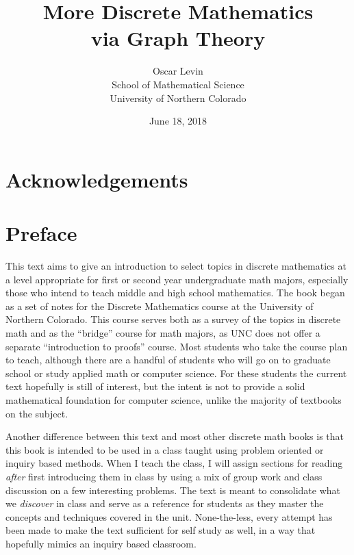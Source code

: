 \documentclass[10pt,]{book}
\title{More Discrete Mathematics\\
{\large via Graph Theory}}
\author{Oscar Levin\\
School of Mathematical Science\\
University of Northern Colorado
}
\date{June 18, 2018}
\theoremstyle{plain}
\theoremstyle{definition}
\theoremstyle{definition}
\theoremstyle{definition}
\theoremstyle{definition}
\numberwithin{equation}{chapter}
\begin{document}
\frontmatter


\chapter*{Acknowledgements}\label{acknowledgement-1}
\chapter*{Preface}\label{preface}
\hypertarget{p-1}{}%
This text aims to give an introduction to select topics in discrete mathematics at a level appropriate for first or second year undergraduate math majors, especially those who intend to teach middle and high school mathematics. The book began as a set of notes for the Discrete Mathematics course at the University of Northern Colorado. This course serves both as a survey of the topics in discrete math and as the ``bridge'' course for math majors, as UNC does not offer a separate ``introduction to proofs'' course. Most students who take the course plan to teach, although there are a handful of students who will go on to graduate school or study applied math or computer science. For these students the current text hopefully is still of interest, but the intent is not to provide a solid mathematical foundation for computer science, unlike the majority of textbooks on the subject.%
\par
\hypertarget{p-2}{}%
Another difference between this text and most other discrete math books is that this book is intended to be used in a class taught using problem oriented or inquiry based methods. When I teach the class, I will assign sections for reading \emph{after} first introducing them in class by using a mix of group work and class discussion on a few interesting problems. The text is meant to consolidate what we \emph{discover} in class and serve as a reference for students as they master the concepts and techniques covered in the unit. None-the-less, every attempt has been made to make the text sufficient for self study as well, in a way that hopefully mimics an inquiry based classroom.%
\par
\hypertarget{p-3}{}%
\end{document}
